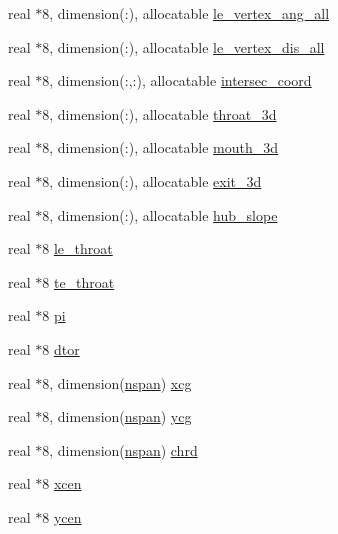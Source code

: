 \begin{DoxyCompactItemize}
\item 
real $\ast$8, dimension(\+:), allocatable \hyperlink{namespaceglobvar_a7d4d625f7e3e19483e2e9c240a928d2e}{le\+\_\+vertex\+\_\+ang\+\_\+all}
\item 
real $\ast$8, dimension(\+:), allocatable \hyperlink{namespaceglobvar_a21aa33a09bc33a7e6c7fcb16ca4b9ecf}{le\+\_\+vertex\+\_\+dis\+\_\+all}
\item 
real $\ast$8, dimension(\+:,\+:), allocatable \hyperlink{namespaceglobvar_ad35c726e5eed845b38c59490c65bd02e}{intersec\+\_\+coord}
\item 
real $\ast$8, dimension(\+:), allocatable \hyperlink{namespaceglobvar_a96fc48391a183ef7111ef81f05d289a5}{throat\+\_\+3d}
\item 
real $\ast$8, dimension(\+:), allocatable \hyperlink{namespaceglobvar_aca439d842ea97d1d7e30e6e925fddd19}{mouth\+\_\+3d}
\item 
real $\ast$8, dimension(\+:), allocatable \hyperlink{namespaceglobvar_a76a4a0e1d9be5d28829cd29c3e41a533}{exit\+\_\+3d}
\item 
real $\ast$8, dimension(\+:), allocatable \hyperlink{namespaceglobvar_ae3e1714c3ebebc9e95b28edd32df9f8e}{hub\+\_\+slope}
\item 
real $\ast$8 \hyperlink{namespaceglobvar_ae2d9b98958aa2b453bdcb189a5b8b140}{le\+\_\+throat}
\item 
real $\ast$8 \hyperlink{namespaceglobvar_a9eef0dca95de0a13eb716ae8aef154c5}{te\+\_\+throat}
\item 
real $\ast$8 \hyperlink{namespaceglobvar_a201c98f02f6744953f40e1c007630bc0}{pi}
\item 
real $\ast$8 \hyperlink{namespaceglobvar_a3346ec2679bdcc117cc6b09e8eb2a7dd}{dtor}
\item 
real $\ast$8, dimension(\hyperlink{namespaceglobvar_adeb7d084c25deee7802eab03d40830c5}{nspan}) \hyperlink{namespaceglobvar_a7e4a1b87658252043b32443ffafb3ddf}{xcg}
\item 
real $\ast$8, dimension(\hyperlink{namespaceglobvar_adeb7d084c25deee7802eab03d40830c5}{nspan}) \hyperlink{namespaceglobvar_a7c65a1d76a91eab0217e09e6be6d2eb0}{ycg}
\item 
real $\ast$8, dimension(\hyperlink{namespaceglobvar_adeb7d084c25deee7802eab03d40830c5}{nspan}) \hyperlink{namespaceglobvar_a55febb83fd05cacf2e926878777e3515}{chrd}
\item 
real $\ast$8 \hyperlink{namespaceglobvar_afe183ce32de3adfc403b0f269a275676}{xcen}
\item 
real $\ast$8 \hyperlink{namespaceglobvar_ac64739121560b1c588700a14f6bc9cae}{ycen}

\end{DoxyCompactItemize}
